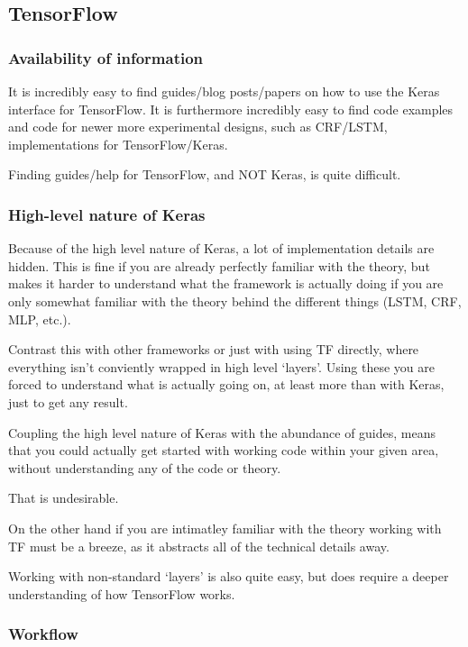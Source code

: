 \subsection{TensorFlow}

\subsubsection{Availability of information}

It is incredibly easy to find guides/blog posts/papers on how to use the Keras
interface for TensorFlow. It is furthermore incredibly easy to find code
examples and code for newer more experimental designs, such as CRF/LSTM,
implementations for TensorFlow/Keras.

Finding guides/help for TensorFlow, and NOT Keras, is quite difficult.

\subsubsection{High-level nature of Keras}

Because of the high level nature of Keras, a lot of implementation details are
hidden. This is fine if you are already perfectly familiar with the theory, but
makes it harder to understand what the framework is actually doing if you are
only somewhat familiar with the theory behind the different things  (LSTM, CRF,
MLP, etc.).

Contrast this with other frameworks or just with using TF directly, where
everything isn't conviently wrapped in high level `layers'. Using these you are
forced to understand what is actually going on, at least more than with Keras,
just to get any result.

Coupling the high level nature of Keras with the abundance of guides, means that
you could actually get started with working code within your given area, without
understanding any of the code or theory.

That is undesirable.

On the other hand if you are intimatley familiar with the theory working with TF
must be a breeze, as it abstracts all of the technical details away.

Working with non-standard `layers' is also quite easy, but does require a deeper
understanding of how TensorFlow works.

\subsubsection{Workflow}

